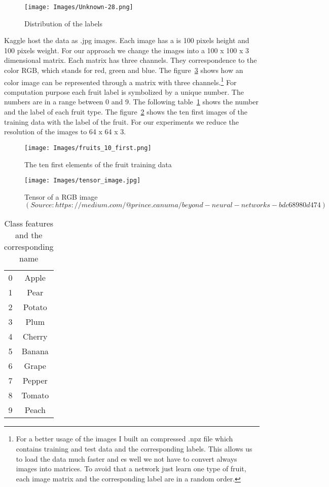 \documentclass[11pt, a4paper]{article}
\begin{document}
\begin{figure}[htp]
\centering
\texttt{[image: Images/Unknown-28.png]} 
\caption{Distribution of the labels}
\label{fig: distri}
\end{figure}

Kaggle host the data as .jpg images. Each image has a is 100 pixels height and 100 pixels weight. For our approach we change the images into a 100 x 100 x 3 dimensional matrix.
Each matrix has three channels. They correspondence to the color RGB, which stands for red, green and blue. The figure~\ref{fig: tensor_channel} shows how an color image can be represented through a matrix with three channels.\footnote{For a better usage of the images I built an compressed .npz file which contains training and test data and the  corresponding labels. This allows us to load the data much faster and es well we not have to convert always images into matrices. To avoid that a network just learn one type of fruit, each image matrix and the corresponding label are in a random order.}
For computation purpose each fruit label is symbolized by a unique number. The numbers are in a range between 0 and 9. The following table~\ref{tab: class_feature} shows the number and the label of each fruit type. The figure~\ref{fig: fruit_10} shows the ten first images of the training data with the label of the fruit.
For our experiments we reduce the resolution of the images to 64 x 64 x 3.

\begin{figure}[htp]
\centering
\texttt{[image: Images/fruits\_10\_first.png]} 
\caption{The ten first elements of the fruit training data}
\label{fig: fruit_10}
\end{figure}

\begin{figure}[htp]
\centering
\texttt{[image: Images/tensor\_image.jpg]} 
\caption{Tensor of a RGB image $(Source: https://medium.com/@prince.canuma/beyond-neural-networks-bdc68980d474)$}
\label{fig: tensor_channel}
\end{figure}

\begin{table}[htp]
\centering
\begin{tabular}{|c|c|}
\hline
0 & Apple \\ 
1 & Pear \\
2 & Potato \\
3 & Plum \\
4 & Cherry \\
5 & Banana \\
6 & Grape \\
7 & Pepper \\
8 & Tomato \\
9 & Peach \\
\hline
\end{tabular}
\caption{Class features and the corresponding name}
\label{tab: class_feature} 
\end{table}
\end{document}
